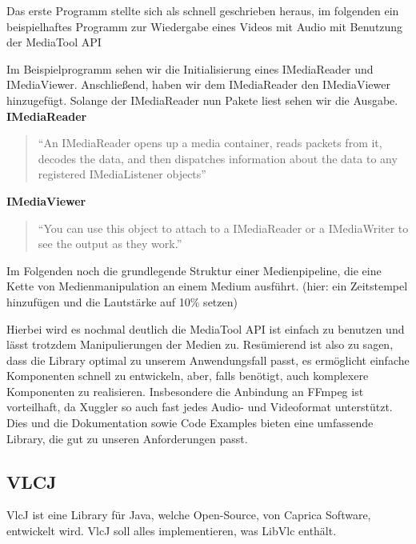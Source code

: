 Das erste Programm stellte sich als schnell geschrieben heraus, im folgenden ein beispielhaftes Programm zur Wiedergabe eines Videos mit Audio mit Benutzung der MediaTool API



Im Beispielprogramm sehen wir die Initialisierung eines IMediaReader und IMediaViewer. Anschließend, haben wir dem IMediaReader den IMediaViewer hinzugefügt. Solange der IMediaReader nun Pakete liest sehen wir die Ausgabe.
\newpage
\textbf{IMediaReader}
\begin{quote}
“An IMediaReader opens up a media container, reads packets from it, decodes the data, and then dispatches information about the data to any registered IMediaListener objects”\cite{xuggle_imediareader}
\end{quote}
\textbf{IMediaViewer}
\begin{quote}
“You can use this object to attach to a IMediaReader or a IMediaWriter to see the output as they work.”\cite{xuggle_imediaviewer}
\end{quote}

Im Folgenden noch die grundlegende Struktur einer Medienpipeline, die eine Kette von Medienmanipulation an einem Medium ausführt. (hier: ein Zeitstempel hinzufügen und die Lautstärke auf 10\% setzen)



Hierbei wird es nochmal deutlich \- die MediaTool API ist einfach zu benutzen und lässt trotzdem Manipulierungen der Medien zu. Resümierend ist also zu sagen, dass die Library optimal zu unserem Anwendungsfall passt, es ermöglicht einfache Komponenten schnell zu entwickeln, aber, falls benötigt, auch komplexere Komponenten zu realisieren. Insbesondere die Anbindung an FFmpeg ist vorteilhaft, da Xuggler so auch fast jedes Audio- und Videoformat unterstützt. Dies und die Dokumentation sowie Code Examples bieten eine umfassende Library, die gut zu unseren Anforderungen passt.


\newpage
\subsection{VLCJ}
VlcJ ist eine Library für Java, welche Open-Source, von Caprica Software, entwickelt wird. VlcJ soll alles implementieren, was LibVlc enthält.

